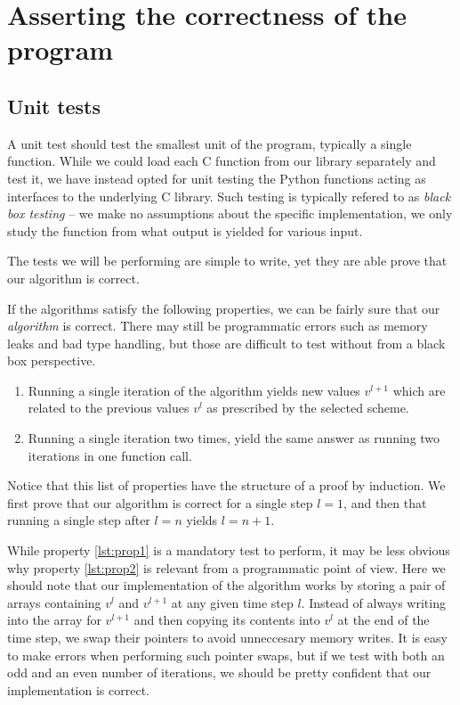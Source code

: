 \section{Asserting the correctness of the program}
\label{appx:testing}
\subsection{Unit tests}
A unit test should test the smallest unit of the program, typically a single function. While we could load each C function from our library separately and test it, we have instead opted for unit testing the Python functions acting as interfaces to the underlying C library. Such testing is typically refered to as \emph{black box testing} -- we make no assumptions about the specific implementation, we only study the function from what output is yielded for various input.

The tests we will be performing are simple to write, yet they are able prove that our algorithm is correct.

If the algorithms satisfy the following properties, we can be fairly sure that our \emph{algorithm} is correct. There may still be programmatic errors such as memory leaks and bad type handling, but those are difficult to test without from a black box perspective.
\begin{enumerate}[label=(\roman*)]
    \item Running a single iteration of the algorithm yields new values $v^{l+1}$ which are related to the previous values $v^l$ as prescribed by the selected scheme. \label{lst:prop1}
    \item Running a single iteration two times, yield the same answer as running two iterations in one function call.\label{lst:prop2}
\end{enumerate}

Notice that this list of properties have the structure of a proof by induction. We first prove that our algorithm is correct for a single step $l = 1$, and then that running a single step after $l = n$ yields $l = n+1$.

While property \ref{lst:prop1} is a mandatory test to perform, it may be less obvious why property \ref{lst:prop2} is relevant from a programmatic point of view. Here we should note that our implementation of the algorithm works by storing a pair of arrays containing $v^l$ and $v^{l+1}$ at any given time step $l$. Instead of always writing into the array for $v^{l+1}$ and then copying its contents into $v^l$ at the end of the time step, we swap their pointers to avoid unneccesary memory writes. It is easy to make errors when performing such pointer swaps, but if we test with both an odd and an even number of iterations, we should be pretty confident that our implementation is correct.

